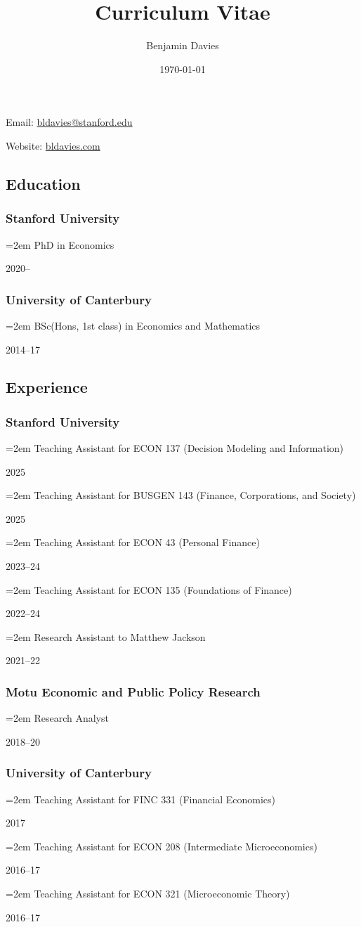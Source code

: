 \documentclass[11pt,oneside]{memoir}
\title{Curriculum Vitae}
\author{Benjamin Davies}
\date{\today}
\newcommand{\entry}[2]{\par\parbox[t]{0.9\linewidth}{\strut\raggedright\hangindent=2em #2\strut}\hfill#1}
\begin{document}
\chapter{\theauthor}

Email: \href{mailto:bldavies@stanford.edu}{bldavies@stanford.edu}

Website: \href{https://bldavies.com}{bldavies.com}

\section{Education}

\subsection{Stanford University}
\entry{2020--}{PhD in Economics}

\subsection{University of Canterbury}
\entry{2014--17}{BSc(Hons, 1st class) in Economics and Mathematics}

\section{Experience}

\subsection{Stanford University}
\entry{2025}{Teaching Assistant for ECON 137 (Decision Modeling and Information)}
\entry{2025}{Teaching Assistant for BUSGEN 143 (Finance, Corporations, and Society)}
\entry{2023--24}{Teaching Assistant for ECON 43 (Personal Finance)}
\entry{2022--24}{Teaching Assistant for ECON 135 (Foundations of Finance)}
\entry{2021--22}{Research Assistant to Matthew Jackson}

\subsection{Motu Economic and Public Policy Research}
\entry{2018--20}{Research Analyst}

\subsection{University of Canterbury}
\entry{2017}{Teaching Assistant for FINC 331 (Financial Economics)}
\entry{2016--17}{Teaching Assistant for ECON 208 (Intermediate Microeconomics)}
\entry{2016--17}{Teaching Assistant for ECON 321 (Microeconomic Theory)}
\end{document}
